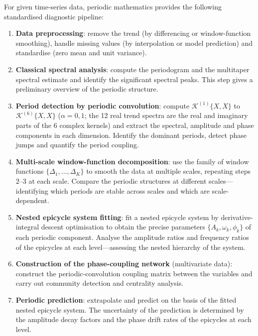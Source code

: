 \begin{definition}\label{def:data_diagnosis_pipeline}
For given time-series data, periodic mathematics provides the following standardised diagnostic pipeline:
\begin{enumerate}[label=(\roman*)]
    \item \textbf{Data preprocessing}: remove the trend (by differencing or window-function smoothing), handle missing values (by interpolation or model prediction) and standardise (zero mean and unit variance).
    \item \textbf{Classical spectral analysis}: compute the periodogram and the multitaper spectral estimate and identify the significant spectral peaks. This step gives a preliminary overview of the periodic structure.
    \item \textbf{Period detection by periodic convolution}: compute $\mathcal{K}^{(1)}\{X, X\}$ to $\mathcal{K}^{(6)}\{X, X\}$ ($\alpha=0,1$; the 12 real trend spectra are the real and imaginary parts of the 6 complex kernels) and extract the spectral, amplitude and phase components in each dimension. Identify the dominant periods, detect phase jumps and quantify the period coupling.
    \item \textbf{Multi-scale window-function decomposition}: use the family of window functions $\{\Delta_1, \dots, \Delta_K\}$ to smooth the data at multiple scales, repeating steps $2$--$3$ at each scale. Compare the periodic structures at different scales---identifying which periods are stable across scales and which are scale-dependent.
    \item \textbf{Nested epicycle system fitting}: fit a nested epicycle system by derivative-integral descent optimisation to obtain the precise parameters $\{A_k, \omega_k, \phi_k\}$ of each periodic component. Analyse the amplitude ratios and frequency ratios of the epicycles at each level---assessing the nested hierarchy of the system.
    \item \textbf{Construction of the phase-coupling network} (multivariate data): construct the periodic-convolution coupling matrix between the variables and carry out community detection and centrality analysis.
    \item \textbf{Periodic prediction}: extrapolate and predict on the basis of the fitted nested epicycle system. The uncertainty of the prediction is determined by the amplitude decay factors and the phase drift rates of the epicycles at each level.
\end{enumerate}
\end{definition}

